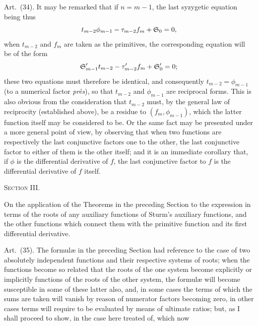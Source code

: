 \documentclass[11pt]{article}
\newcommand{\subpaperhead}[1]{\begin{center}{\large\scshape #1}\end{center}}
\newcommand{\sourcepage}[1]{\marginpar{\scriptsize p.~#1}}
\newcommand{\art}[1]{\par\smallskip\noindent Art.~(#1).\quad}
\begin{document}
\sourcepage{483}
\art{34} It may be remarked that if $n=m-1$, the last syzygetic equation being thus
\[
t_{m-2}\phi_{m-1}-\tau_{m-2}f_m+\mathfrak{S}_0=0,
\]
when $t_{m-2}$ and $f_m$ are taken as the primitives, the corresponding equation will be of the form
\[
\mathfrak{S}'_{m-1}t_{m-2}-\tau'_{m-2}f_m+\mathfrak{S}'_0=0;
\]
these two equations must therefore be identical, and consequently $t_{m-2}=\phi_{m-1}$ (to a numerical factor \emph{près}), so that $t_{m-2}$ and $\phi_{m-1}$ are reciprocal forms. This is also obvious from the consideration that $t_{m-2}$ must, by the general law of reciprocity (established above), be a residue to $(f_m,\phi_{m-1})$, which the latter function itself may be considered to be. Or the same fact may be presented under a more general point of view, by observing that when two functions are respectively the last conjunctive factors one to the other, the last conjunctive factor to either of them is the other itself; and it is an immediate corollary that, if $\phi$ is the differential derivative of $f$, the last conjunctive factor to $f$ is the differential derivative of $f$ itself.

\subpaperhead{Section III.}

On the application of the Theorems in the preceding Section to the expression in terms of the roots of any auxiliary functions of Sturm's auxiliary functions, and the other functions which connect them with the primitive function and its first differential derivative.

\art{35} The formulæ in the preceding Section had reference to the case of two absolutely independent functions and their respective systems of roots; when the functions become so related that the roots of the one system become explicitly or implicitly functions of the roots of the other system, the formulæ will become susceptible in some of these latter also, and, in some cases the terms of which the sums are taken will vanish by reason of numerator factors becoming zero, in other cases terms will require to be evaluated by means of ultimate ratios; but, as I shall proceed to show, in the case here treated of, which now
\end{document}
